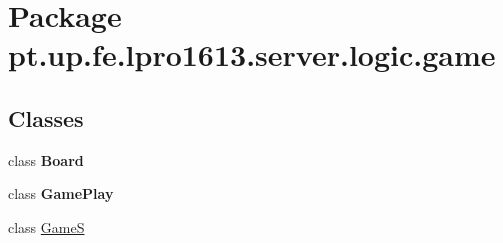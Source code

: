 \hypertarget{namespacept_1_1up_1_1fe_1_1lpro1613_1_1server_1_1logic_1_1game}{}\section{Package pt.\+up.\+fe.\+lpro1613.\+server.\+logic.\+game}
\label{namespacept_1_1up_1_1fe_1_1lpro1613_1_1server_1_1logic_1_1game}
\subsection*{Classes}
\begin{DoxyCompactItemize}
\item 
class {\bfseries Board}
\item 
class {\bfseries Game\+Play}
\item 
class \hyperlink{classpt_1_1up_1_1fe_1_1lpro1613_1_1server_1_1logic_1_1game_1_1_game_s}{GameS}
\end{DoxyCompactItemize}
